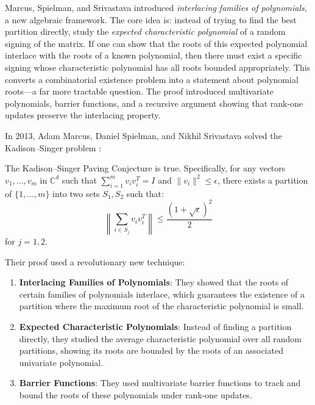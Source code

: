 Marcus, Spielman, and Srivastava introduced \emph{interlacing families of polynomials}, a new algebraic framework. The core idea is: instead of trying to find the best partition directly, study the \emph{expected characteristic polynomial} of a random signing of the matrix. If one can show that the roots of this expected polynomial interlace with the roots of a known polynomial, then there must exist a specific signing whose characteristic polynomial has all roots bounded appropriately. This converts a combinatorial existence problem into a statement about polynomial roots---a far more tractable question. The proof introduced multivariate polynomials, barrier functions, and a recursive argument showing that rank-one updates preserve the interlacing property.

In 2013, Adam Marcus, Daniel Spielman, and Nikhil Srivastava solved the Kadison--Singer problem \cite{marcus2015a, marcus2015b}:

\begin{theorem}
The Kadison--Singer Paving Conjecture is true. Specifically, for any vectors $v_1, \ldots, v_m$ in $\mathbb{C}^d$ such that $\sum_{i=1}^m v_i v_i^T = I$ and $\|v_i\|^2 \leq \epsilon$, there exists a partition of $\{1, \ldots, m\}$ into two sets $S_1, S_2$ such that:
\begin{equation}
\left\|\sum_{i \in S_j} v_i v_i^T\right\| \leq \frac{(1 + \sqrt{\epsilon})^2}{2}
\end{equation}
for $j=1,2$.
\end{theorem}

Their proof used a revolutionary new technique:

\begin{enumerate}
\item \textbf{Interlacing Families of Polynomials}: They showed that the roots of certain families of polynomials interlace, which guarantees the existence of a partition where the maximum root of the characteristic polynomial is small.
\item \textbf{Expected Characteristic Polynomials}: Instead of finding a partition directly, they studied the average characteristic polynomial over all random partitions, showing its roots are bounded by the roots of an associated univariate polynomial.
\item \textbf{Barrier Functions}: They used multivariate barrier functions to track and bound the roots of these polynomials under rank-one updates.
\end{enumerate}

